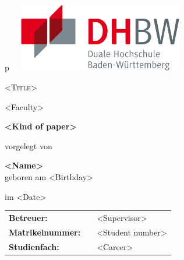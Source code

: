 \thispagestyle{empty}

\begin{center}
    \begin{tabular}{p{\textwidth}}
        \centering
        \includegraphics[width=8cm, height=3cm]{Images/DHBW-Logo.png}\\[1,5cm]

        \begin{center}
            \LARGE{\textsc{<Title>}}\\[1,5cm]
        \end{center}

        \begin{center}
            \large{<Faculty>\\[1,5cm]}
        \end{center}

        \begin{center}
            \textbf{\Large{<Kind of paper>\\[1,5 cm]}}
        \end{center}

        \begin{center}
            vorgelegt von\\[1,5cm]
        \end{center}

        \begin{center}
            \large{\textbf{<Name>}} \\
            \small{geboren am <Birthday>\\[1,5cm]}
        \end{center}

        \begin{center}
            \large{im <Date>}\\[1,5cm]
        \end{center}

        \begin{center}
            \begin{tabular}{lll}
            \textbf{Betreuer:} & & <Supervisor>\\
            \textbf{Matrikelnummer:} & & <Student number>\\
            \textbf{Studienfach: } & & <Career>
    \end{tabular}
\end{center}

\end{tabular}
\end{center}